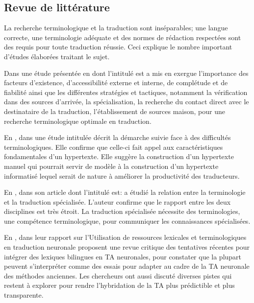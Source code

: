 \documentclass{textolivre}
\begin{document}
\subsection{Revue de littérature}\label{sec-revue}
La recherche terminologique et la traduction sont inséparables; une langue correcte, une terminologie adéquate et des normes de rédaction respectées sont des requis pour toute traduction réussie. Ceci explique le nombre important d’études élaborées traitant le sujet.

Dans une étude présentée en \citeyear*{gile1994} dont l’intitulé est   a mis en exergue l’importance des facteurs d’existence, d’accessibilité externe et interne, de complétude et de fiabilité ainsi que les différentes stratégies et tactiques, notamment la vérification dans des sources d'arrivée, la spécialisation, la recherche du contact direct avec le destinataire de la traduction, l'établissement de sources maison, pour une recherche terminologique optimale en traduction.

En \citeyear*{durieux1997},  dans une étude intitulée  décrit la démarche suivie face à des difficultés terminologiques. Elle confirme que celle-ci fait appel aux caractéristiques fondamentales d’un hypertexte. Elle suggère la construction d’un hypertexte manuel qui pourrait servir de modèle à la construction d’un hypertexte informatisé lequel serait de nature à améliorer la productivité des traducteurs.

En \citeyear*{navarro2016},  dans son article dont l’intitulé est:  a étudié la relation entre la terminologie et la traduction spécialisée. L’auteur confirme que le rapport entre les deux disciplines est très étroit. La traduction spécialisée nécessite des terminologies, une compétence terminologique, pour communiquer les connaissances spécialisées. 

En \citeyear*{yvon2020},  dans leur rapport sur l’Utilisation de ressources lexicales et terminologiques en traduction neuronale proposent une revue critique des tentatives récentes pour intégrer des lexiques bilingues en TA neuronales, pour constater que la plupart peuvent s’interpréter comme des essais pour adapter au cadre de la TA neuronale des méthodes anciennes. Les chercheurs ont aussi discuté diverses pistes qui restent à explorer pour rendre l’hybridation de la TA plus prédictible et plus transparente. 
\end{document}
